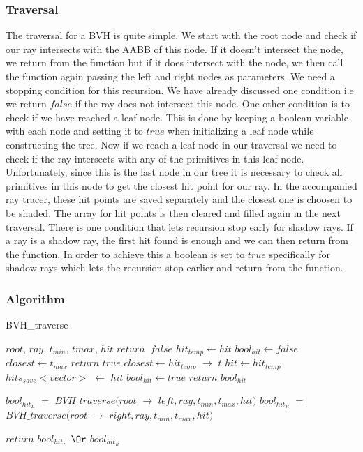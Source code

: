 \documentclass[11pt,a4paper]{article}
\begin{document}
\subsubsection{Traversal}
The traversal for a BVH is quite simple. We start with the root node and check if our ray intersects with the AABB of this node. If it doesn't intersect the node, we return from the function but if it does intersect with the node, we then call the function again passing the left and right nodes as parameters. We need a stopping condition for this recursion. We have already discussed one condition i.e we return $false$ if the ray does not intersect this node. One other condition is to check if we have reached a leaf node. This is done by keeping a boolean variable with each node and setting it to $true$ when initializing a leaf node while constructing the tree. Now if we reach a leaf node in our traversal we need to check if the ray intersects with any of the primitives in this leaf node. Unfortunately, since this is the last node in our tree it is necessary to check all primitives in this node to get the closest hit point for our ray. In the accompanied ray tracer, these hit points are saved separately and the closest one is choosen to be shaded. The array for hit points is then cleared and filled again in the next traversal. There is one condition that lets recursion stop early for shadow rays. If a ray is a shadow ray, the first hit found is enough and we can then return from the function. In order to achieve this a boolean is set to $true$ specifically for shadow rays which lets the recursion stop earlier and return from the function.
\subsubsection{Algorithm}
\begin{algorithm}
	\caption{BVH\_traverse}\label{alg:cap}
	\begin{algorithmic}
		\Require $root$, $ray$, $t_{min}$, $t{max}$, $hit$
			\State $return\;\;false$
		\EndIf
			\State $hit_{temp} \leftarrow hit$
			\State $bool_{hit} \leftarrow false$
			\State $closest \leftarrow t_{max}$
			\State $return$ $true$ 
			\EndIf
			\State $closest \leftarrow hit_{temp}$ $\rightarrow$ $t$
			\State $hit \leftarrow hit_{temp}$
			\State $hits_{save}<vector>$ $\leftarrow$ $hit$
			\State $bool_{hit} \leftarrow true$
			\EndIf
			\EndFor
			\State $return$ $bool_{hit}$
		\EndIf
		
		\State $bool_{hit_{L}}$ $=$ $BVH\_traverse(root$ $\rightarrow$ $left, ray, t_{min}, t_{max}, hit)$
		\State $bool_{hit_{R}}$ $=$ $BVH\_traverse(root$ $\rightarrow$ $right, ray, t_{min}, t_{max}, hit)$
	
		\State $return$ $bool_{hit_{L}}$ $\Or$ $bool_{hit_{R}}$
	\end{algorithmic}
\end{algorithm}
\pagebreak
\end{document}
